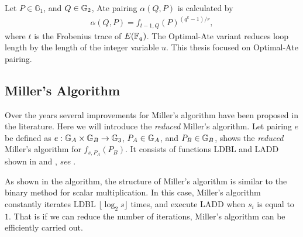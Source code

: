Let $P\in\mathbb{G}_1$, and $Q\in {\mathbb{G}}_{2}$, Ate pairing $\alpha(Q,P)$ is calculated by
\begin{eqnarray}
\alpha(Q,P) = f_{t-1,Q}(P)^{(q^{k}-1)/r}, \label{eq:AteCalc}
\end{eqnarray}
where $t$ is the Frobenius trace of $E({\mathbb{F}}_{q^{}})$.
The Optimal-Ate variant reduces loop length by the length of the integer variable $u$.
This thesis focused on Optimal-Ate pairing.




\subsection{Miller's Algorithm}

Over the years several improvements for Miller's algorithm have been proposed in the literature. Here we will introduce the {\it reduced} Miller's algorithm. 
Let pairing $e$ be defined as $e:{\mathbb{G}}_{A}\times{\mathbb{G}}_{B}\rightarrow{\mathbb{G}}_{3}$, $P_A\in{\mathbb{G}}_{A}$, and $P_B\in{\mathbb{G}}_{B}$,  shows the {\it reduced} Miller's algorithm for $f_{s,P_A}(P_B)$.
It consists of functions LDBL and LADD shown in 
and , {\it see} .

As shown in the algorithm, the structure of Miller's algorithm is similar to the binary method for scalar multiplication.
In this case, Miller's algorithm constantly iterates LDBL $\lfloor\log_2s\rfloor$ times, and execute LADD when $s_i$ is equal to $1$. 
That is if we can reduce the number of iterations, Miller's algorithm can be efficiently carried out.

